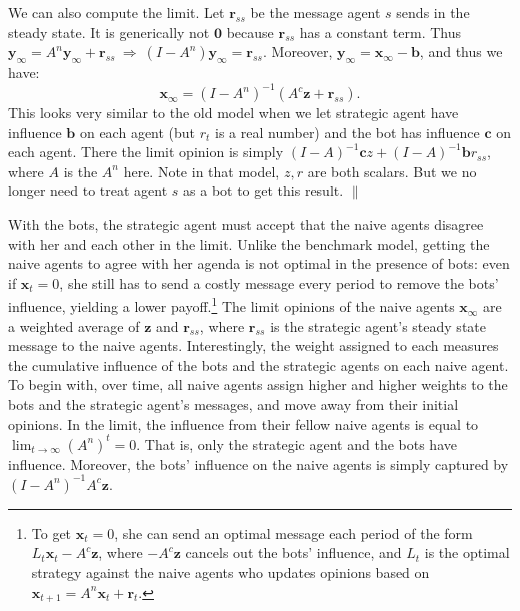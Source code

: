 \documentclass{article}
\newcommand{\x}{\mathbf{x}}
\newcommand{\y}{\mathbf{y}}
\newcommand{\be}{\mathbf{b}}
\newcommand{\ce}{\mathbf{c}}
\newcommand{\re}{\mathbf{r}}
\newcommand{\z}{\mathbf{z}}
\begin{document}
We can also compute the limit. Let $\re_{ss}$ be the message agent $s$ sends in the steady state. It is generically not $\mathbf 0$ because $\re_{ss}$ has a constant term. Thus $\y_\infty=A^n\y_\infty+\re_{ss} \ \Rightarrow \ (I-A^n)\y_\infty=\re_{ss}$. Moreover, $\y_\infty=\x_\infty-\be$, and thus we have:
$$\x_\infty=(I-A^n)^{-1}(A^c\z+\re_{ss}).$$
This looks very similar to the old model when we let strategic agent have influence $\be$ on each agent (but $r_t$ is a real number) and the bot has influence $\ce$ on each agent. There the limit opinion is simply $(I-A)^{-1}\ce z+(I-A)^{-1}\be r_{ss}$, where $A$ is the $A^n$ here. Note in that model, $z,r$ are both scalars.  But we no longer need to treat agent $s$ as a bot to get this result. $\|$


With the bots, the strategic agent must accept that the naive agents disagree with her and each other in the limit. Unlike the benchmark model, getting the naive agents to agree with her agenda is not optimal in the presence of bots: even if $\x_t=0$, she still has to send a costly message every period to remove the bots' influence, yielding a lower payoff.\footnote{To get $\x_t=0$, she can send an optimal message each period of the form $L_t\x_t-A^c\z$, where $-A^c\z$ cancels out the bots' influence, and $L_t$ is the optimal strategy against the naive agents who updates opinions based on $\x_{t+1}=A^n\x_t+\re_t$.}  The limit opinions of the naive agents $\x_\infty$ are a weighted average of $\z$ and $\re_{ss}$, where $\re_{ss}$ is the strategic agent's steady state message to the naive agents. Interestingly, the weight assigned to each measures the cumulative influence of the bots and the strategic agents on each naive agent. To begin with, over time, all naive agents assign higher and higher weights to the bots and the strategic agent's messages, and move away from their initial opinions. In the limit, the influence from their fellow naive agents is equal to $\lim_{t \to \infty}(A^n)^t=0$. That is, only the strategic agent and the bots have influence. Moreover, the bots' influence on the naive agents is simply captured by $(I-A^n)^{-1}A^c\z$. 
\end{document}
